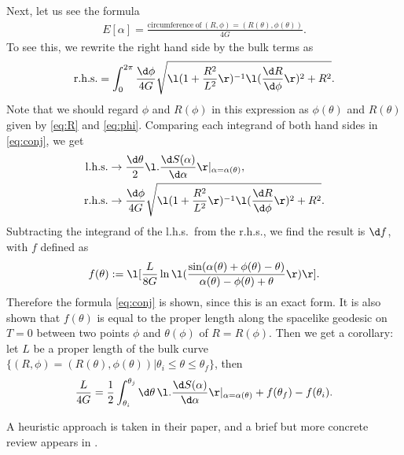\documentclass[12pt]{article}
\begin{document}
Next, let us see the formula
\begin{align}
	E[\alpha] = \frac{\mathrm{circumference~of~}(R,\phi) = (R(\theta),\phi(\theta))}{4G}.\label{eq:conj}
\end{align}
To see this, we rewrite the right hand side by the bulk terms as
\begin{align}
	\mathrm{r.h.s.} = \int_0^{2\pi} \frac{\d\phi}{4G}\sqrt{\l(1 + \frac{R^2}{L^2}\r)^{-1}\l(\frac{\d R}{\d \phi}\r)^2 + R^2}.
\end{align}
Note that we should regard $\phi$ and $R(\phi)$ in this expression as $\phi(\theta)$ and $R(\theta)$ given by \eqref{eq:R} 
and \eqref{eq:phi}.
Comparing each integrand of both hand sides in \eqref{eq:conj}, we get
\begin{align}
	\mathrm{l.h.s.} &\rightarrow \frac{\d\theta}{2}\l.\frac{\d S(\alpha)}{\d\alpha}\r|_{\alpha = \alpha(\theta)},\\
	\mathrm{r.h.s.} &\rightarrow \frac{\d\phi}{4G}\sqrt{\l(1 + \frac{R^2}{L^2}\r)^{-1}\l(\frac{\d R}{\d \phi}\r)^2 + R^2}.
\end{align}
Subtracting the integrand of the l.h.s.\ from the r.h.s., we find the result is $\d f$, with $f$ defined as
\begin{align}
	f(\theta) := \l[\frac{L}{8G}\ln\l(\frac{\sin(\alpha(\theta)+\phi(\theta)-\theta)}{\alpha(\theta)-\phi(\theta) + \theta} \r) \r].
\end{align}
Therefore the formula \eqref{eq:conj} is shown, since this is an exact form.
It is also shown that $f(\theta)$ is equal to the proper length along the spacelike geodesic on $T=0$ between two points $\phi$ and $\theta(\phi)$ of $R = R(\phi)$.
Then we get a corollary: let $L$ be a proper length of the bulk curve $\{(R,\phi) = (R(\theta),\phi(\theta))|\theta_i\le\theta\le \theta_f\}$, then
\begin{align}
	\frac{L}{4G} = \frac{1}{2}\int_{\theta_i}^{\theta_j}\d\theta\,\l.\frac{\d S(\alpha)}{\d \alpha}\r|_{\alpha = \alpha(\theta)}  + f(\theta_f) - f(\theta_i).
\end{align}

A heuristic approach is taken in their paper, and a brief but more concrete review appears in \cite{Czech:2014ppa}.


































 

\end{document}
